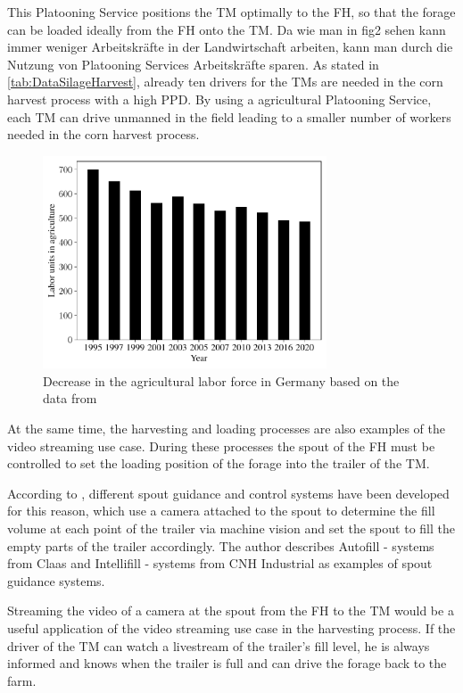 \documentclass[]{nsm-thesis}
\begin{document}
This Platooning Service positions the \ac{TM} optimally to the \ac{FH}, so that the forage can be loaded ideally from the \ac{FH} onto the \ac{TM}.
Da wie man in fig2 sehen kann immer weniger Arbeitskräfte in der Landwirtschaft arbeiten, kann man  durch die Nutzung von Platooning Services Arbeitskräfte sparen. 
As stated in \autoref{tab:DataSilageHarvest}, already ten drivers for the \ac{TM}s are needed in the corn harvest process with a high \ac{PPD}. 
By using a agricultural Platooning Service, each \ac{TM} can drive unmanned in the field leading to a smaller number of workers needed in the corn harvest process.

\begin{figure}%
	\centering
	\includegraphics[width=0.75\textwidth]{figures/WorkForceAgriculture.pdf}
	\caption{Decrease in the agricultural labor force in Germany based on the data from \cite{bmel2020}}%
	\label{fig:workforce_agri}%
\end{figure}


At the same time, the harvesting and loading processes are also examples of the video streaming use case. During these processes the spout of the \ac{FH} must be controlled to set the loading position of the forage into the trailer of the \ac{TM}.

According to \textcite{murcia_quadrotor_2014}, different spout guidance and control systems have been developed for this reason, which use a camera attached to the spout to determine the fill volume at each point of the trailer via machine vision and set the spout to fill the empty parts of the trailer accordingly. The author describes Autofill - systems from Claas and Intellifill - systems from CNH Industrial as examples of spout guidance systems. 

Streaming the video of a camera at the spout from the \ac{FH} to the \ac{TM} would be a useful application of the video streaming use case in the harvesting process. If the driver of the \ac{TM} can watch a livestream of the trailer's fill level, he is always informed and knows when the trailer is full and can drive the forage back to the farm.
\end{document}
